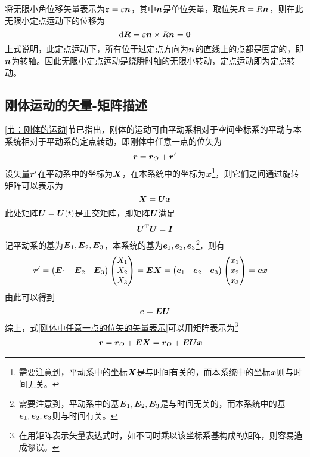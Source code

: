 将无限小角位移矢量表示为$\boldsymbol{\varepsilon} = \varepsilon \boldsymbol{n}$，其中$\boldsymbol{n}$是单位矢量，取位矢$\boldsymbol{R} = R\boldsymbol{n}$，则在此无限小定点运动下的位移为
\begin{equation*}
	\mathrm{d} \boldsymbol{R} = \varepsilon \boldsymbol{n} \times R\boldsymbol{n} = \boldsymbol{0}
\end{equation*}
上式说明，此定点运动下，所有位于过定点方向为$\boldsymbol{n}$的直线上的点都是固定的，即$\boldsymbol{n}$为转轴。因此无限小定点运动是绕瞬时轴的无限小转动，定点运动即为{\heiti 定点转动}。

\subsection{刚体运动的矢量-矩阵描述}

\label{节：刚体运动的矢量-矩阵描述}
\ref{节：刚体的运动}节已指出，刚体的运动可由平动系相对于空间坐标系的平动与本系统相对于平动系的定点转动，即刚体中任意一点的位矢为
\begin{equation}
	\boldsymbol{r} = \boldsymbol{r}_O + \boldsymbol{r}'
	\label{刚体中任意一点的位矢的矢量表示}
\end{equation}
设矢量$\boldsymbol{r}'$在平动系中的坐标为$\boldsymbol{X}$，在本系统中的坐标为$\boldsymbol{x}$\footnote{需要注意到，平动系中的坐标$\boldsymbol{X}$是与时间有关的，而本系统中的坐标$\boldsymbol{x}$则与时间无关。}，则它们之间通过旋转矩阵可以表示为
\begin{equation*}
	\boldsymbol{X} = \boldsymbol{U} \boldsymbol{x}
\end{equation*}
此处矩阵$\boldsymbol{U} = \boldsymbol{U}(t)$是正交矩阵，即矩阵$\boldsymbol{U}$满足
\begin{equation}
	\boldsymbol{U}^{\mathrm{T}} \boldsymbol{U} = \boldsymbol{I}
	\label{正交矩阵的条件}
\end{equation}
记平动系的基为$\boldsymbol{E}_1,\boldsymbol{E}_2,\boldsymbol{E}_3$，本系统的基为$\boldsymbol{e}_1,\boldsymbol{e}_2,\boldsymbol{e}_3$\footnote{需要注意到，平动系中的基$\boldsymbol{E}_1,\boldsymbol{E}_2,\boldsymbol{E}_3$是与时间无关的，而本系统中的基$\boldsymbol{e}_1,\boldsymbol{e}_2,\boldsymbol{e}_3$则与时间有关。}，则有
\begin{align*}
	\boldsymbol{r}' & = \begin{pmatrix} \boldsymbol{E}_1 & \boldsymbol{E}_2 & \boldsymbol{E}_3 \end{pmatrix} \begin{pmatrix} X_1 \\ X_2 \\ X_3 \end{pmatrix} = \boldsymbol{E} \boldsymbol{X} = \begin{pmatrix} \boldsymbol{e}_1 & \boldsymbol{e}_2 & \boldsymbol{e}_3 \end{pmatrix} \begin{pmatrix} x_1 \\ x_2 \\ x_3 \end{pmatrix} = \boldsymbol{e} \boldsymbol{x}
\end{align*}
由此可以得到
\begin{equation*}
	\boldsymbol{e} = \boldsymbol{E} \boldsymbol{U}
\end{equation*}
综上，式\eqref{刚体中任意一点的位矢的矢量表示}可以用矩阵表示为\footnote{在用矩阵表示矢量表达式时，如不同时乘以该坐标系基构成的矩阵，则容易造成谬误。}
\begin{align}
	\boldsymbol{r} & = \boldsymbol{r}_O + \boldsymbol{E} \boldsymbol{X} = \boldsymbol{r}_O + \boldsymbol{E} \boldsymbol{U} \boldsymbol{x}
	\label{刚体中任意一点的位矢}
\end{align}


